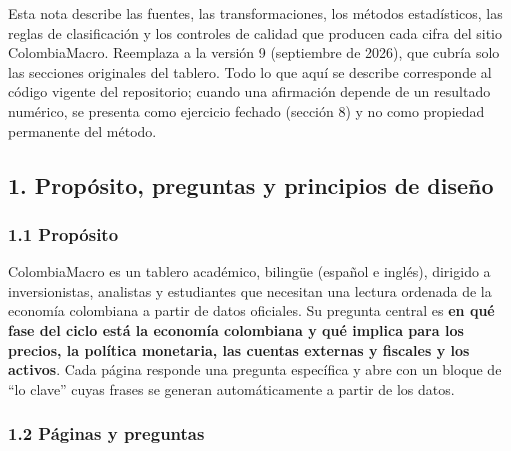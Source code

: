 Esta nota describe las fuentes, las transformaciones, los métodos
estadísticos, las reglas de clasificación y los controles de calidad que
producen cada cifra del sitio ColombiaMacro. Reemplaza a la versión 9
(septiembre de 2026), que cubría solo las secciones originales del
tablero. Todo lo que aquí se describe corresponde al código vigente del
repositorio; cuando una afirmación depende de un resultado numérico, se
presenta como ejercicio fechado (sección 8) y no como propiedad
permanente del método.

\hypertarget{propuxf3sito-preguntas-y-principios-de-diseuxf1o}{%
\subsection{1. Propósito, preguntas y principios de
diseño}\label{propuxf3sito-preguntas-y-principios-de-diseuxf1o}}

\hypertarget{propuxf3sito}{%
\subsubsection{1.1 Propósito}\label{propuxf3sito}}

ColombiaMacro es un tablero académico, bilingüe (español e inglés),
dirigido a inversionistas, analistas y estudiantes que necesitan una
lectura ordenada de la economía colombiana a partir de datos oficiales.
Su pregunta central es \textbf{en qué fase del ciclo está la economía
colombiana y qué implica para los precios, la política monetaria, las
cuentas externas y fiscales y los activos}. Cada página responde una
pregunta específica y abre con un bloque de ``lo clave'' cuyas frases se
generan automáticamente a partir de los datos.

\hypertarget{puxe1ginas-y-preguntas}{%
\subsubsection{1.2 Páginas y preguntas}\label{puxe1ginas-y-preguntas}}

